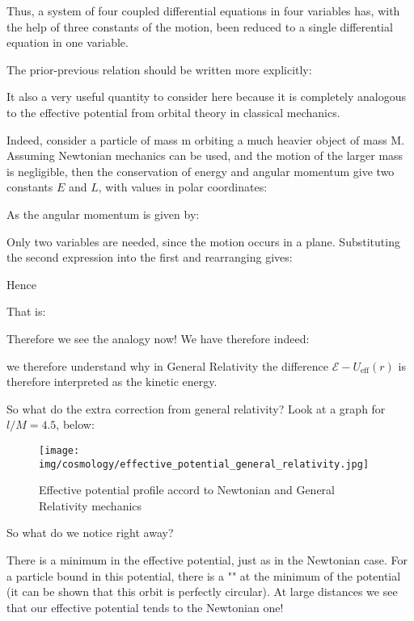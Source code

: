 	Thus, a system of four coupled differential equations in four variables has, with the help of three constants of the motion, been reduced to a single differential equation in one variable.
	\begin{tcolorbox}[title=Remark,colframe=black,arc=10pt]
	The prior-previous relation should be written more explicitly:
	
	\end{tcolorbox}
	It also a very useful quantity to consider here because it is completely analogous to the effective potential from orbital theory in
classical mechanics.

	Indeed, consider a particle of mass m orbiting a much heavier object of mass M. Assuming Newtonian mechanics can be used, and the motion of the larger mass is negligible, then the conservation of energy and angular momentum give two constants $E$ and $L$, with values in polar coordinates:
	
	As the angular momentum is given by:
	
	Only two variables are needed, since the motion occurs in a plane. Substituting the second expression into the first and rearranging gives:
	
	Hence
	
	That is:
	
	Therefore we see the analogy now! We have therefore indeed:
	
	\begin{tcolorbox}[title=Remark,colframe=black,arc=10pt]
	we therefore understand why in General Relativity the difference $\mathcal{E}-U_\text{eff}(r)$ is therefore interpreted as the kinetic energy.
	\end{tcolorbox}
	So what do the extra correction from general relativity? Look at a graph for $l/M = 4.5$, below:
	\begin{figure}[H]
		\centering
		\texttt{[image: img/cosmology/effective\_potential\_general\_relativity.jpg]}
		\caption{Effective potential profile accord to Newtonian and General Relativity mechanics}
	\end{figure}
	So what do we notice right away?
	
	There is a minimum in the effective potential, just as in the Newtonian case. For a particle bound in this potential, there is a "" at the minimum of the potential (it can be shown that this orbit is perfectly circular). At large distances we see that our effective potential tends to the Newtonian one!
	
